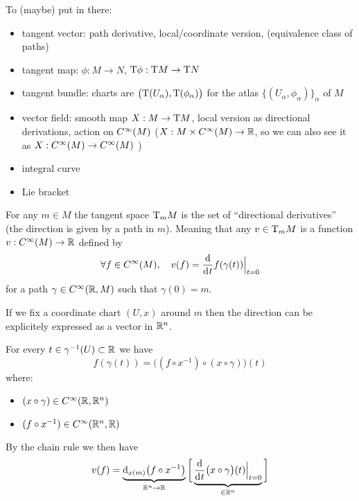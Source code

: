 		To (maybe) put in there:
		\begin{itemize}
			\item tangent vector: path derivative, local/coordinate version, (equivalence class of paths)
			\item tangent map: $\phi: M \to N$, $\mathrm{T}{\phi}: \mathrm{T}{M} \to \mathrm{T}{N}$
			\item tangent bundle: charts are $\big( \mathrm{T}(U_\alpha), \mathrm{T}(\phi_\alpha) \big)$ for the atlas $\big\{ (U_\alpha, \phi_\alpha) \big\}_\alpha$ of $M$
			\item vector field: smooth map $X: M \to \mathrm{T}{M}$, local version as directional derivations, action on $C^\infty(M)$ ($X: M \times C^\infty(M) \to \mathbb{R}$, so we can also see it as $X: C^\infty(M) \to C^\infty(M)$ )
			\item integral curve
			\item Lie bracket
		\end{itemize}

		For any $m \in M$ the tangent space $\mathrm{T}_m{M}$ is the set of ``directional derivatives'' (the direction is given by a path in $m$).
		Meaning that any $v \in \mathrm{T}_m{M}$ is a function $v: C^\infty(M) \to \mathbb{R}$ defined by
		$$
			\forall f \in \Cinf(M), \quad v(f) = \frac{\d}{\di{t}} f(\gamma(t)) \Big|_{t=0}
		$$
		for a path $\gamma \in C^\infty(\mathbb{R}, M)$ such that $\gamma(0) = m$.



		If we fix a coordinate chart $(U, x)$ around $m$ then the direction can be explicitely expressed as a vector in $\mathbb{R}^n$.

		For every $t \in \gamma^{-1}(U) \subset \mathbb{R}$ we have
		$$
			f(\gamma(t)) = \big( (f \circ x^{-1}) \circ (x \circ \gamma) \big)(t)
		$$
		where:
		\begin{itemize}
			\item $(x \circ \gamma) \in C^\infty(\mathbb{R}, \mathbb{R}^n)$
			\item $(f \circ x^{-1}) \in C^\infty(\mathbb{R}^n, \mathbb{R})$
		\end{itemize}
		By the chain rule we then have
		$$
			v(f) = \underbrace{\di[x(m)] \big( f \circ x^{-1} \big)}_{\R^n \to \R} \bigg[ \underbrace{\frac{\d}{\di{t}} \big( x \circ \gamma \big)(t) \Big|_{t=0}}_{\in \R^n} \bigg]
		$$

